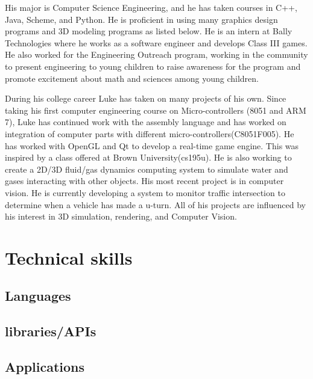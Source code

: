 \documentclass[11pt,a4paper,sans]{moderncv}        %
\begin{document}
His major is Computer Science Engineering, and he has taken courses in C++,  Java, Scheme, and Python. He is proficient in using many graphics design programs and 3D modeling programs as listed below. He is an intern at Bally Technologies where he works as a software engineer and develops Class III games. He also worked for the Engineering Outreach program, working in the community to present engineering to young children to raise awareness for the program and promote excitement about math and sciences among young children.\vspace{.15cm}

During his college career Luke has taken on many projects of his own. Since taking his first computer engineering  course  on  Micro-controllers (8051 and ARM 7), Luke has continued work with the assembly language and has worked on integration of computer parts with different micro-controllers(C8051F005). He has worked with OpenGL and Qt to develop a real-time game engine. This was inspired by a class offered at Brown University(cs195u). He is also working to create a 2D/3D fluid/gas dynamics computing system to simulate water and gases interacting with other objects. His most recent project is in computer vision. He is currently developing a system to monitor traffic intersection to determine when a vehicle has made a u-turn. All of his projects are influenced by his interest in 3D simulation, rendering, and Computer Vision.\\

\section{Technical skills}
\subsection{Languages}

\subsection{libraries/APIs}

\subsection{Applications}
\end{document}
